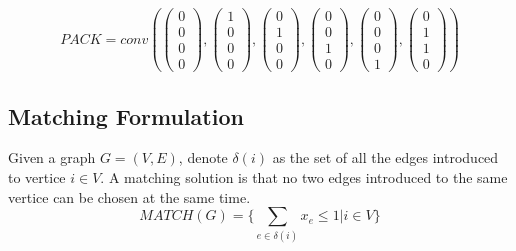 				\begin{equation}
					PACK = conv\left(
						\left(\begin{matrix}0 \\ 0 \\ 0 \\ 0\end{matrix}\right),
						\left(\begin{matrix}1 \\ 0 \\ 0 \\ 0\end{matrix}\right),
						\left(\begin{matrix}0 \\ 1 \\ 0 \\ 0\end{matrix}\right),
						\left(\begin{matrix}0 \\ 0 \\ 1 \\ 0\end{matrix}\right),
						\left(\begin{matrix}0 \\ 0 \\ 0 \\ 1\end{matrix}\right),
						\left(\begin{matrix}0 \\ 1 \\ 1 \\ 0\end{matrix}\right)
						\right)
				\end{equation}

			\subsection{Matching Formulation}
				Given a graph $G=(V, E)$, denote $\delta(i)$ as the set of all the edges introduced to vertice $i\in V$. A matching solution is that no two edges introduced to the same vertice can be chosen at the same time.
				\begin{equation}
					MATCH(G) = \{\sum_{e\in \delta(i)}x_e \le 1|i\in V\}
				\end{equation}

